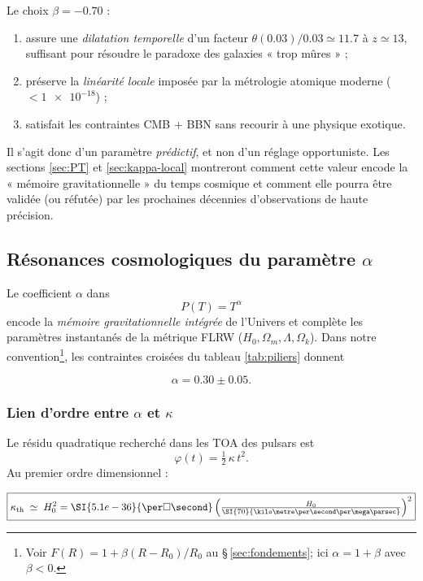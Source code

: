 \documentclass[11pt]{article}
\begin{document}
Le choix \(\beta=-0.70\) :

\begin{enumerate}[label=\arabic*.]
  \item assure une \emph{dilatation temporelle} d’un facteur
        \(\theta(0.03)/0.03\simeq11.7\) à \(z\simeq13\),
        suffisant pour résoudre le paradoxe des galaxies « trop mûres » ;
  \item préserve la \emph{linéarité locale} imposée par la métrologie
        atomique moderne (\(<\num{1e-18}\)) ;
  \item satisfait les contraintes CMB + BBN
        sans recourir à une physique exotique.
\end{enumerate}

Il s’agit donc d’un paramètre \emph{prédictif}, et non d’un réglage
opportuniste.  
Les sections \ref{sec:PT} et \ref{sec:kappa-local} montreront comment cette
valeur encode la « mémoire gravitationnelle » du temps cosmique et comment
elle pourra être validée (ou réfutée) par les prochaines décennies
d’observations de haute précision.

\subsection{Résonances cosmologiques du paramètre
            \texorpdfstring{\(\alpha\)}{alpha}}

Le coefficient \(\alpha\) dans  
\[
  P(T)=T^{\alpha}
\]
encode la \emph{mémoire gravitationnelle intégrée} de l’Univers et
complète les paramètres instantanés de la métrique FLRW
(\(H_{0},\Omega_{m},\Lambda,\Omega_{k}\)).
Dans notre convention\footnote{Voir
\(F(R)=1+\beta(R-R_{0})/R_{0}\) au
§\,\ref{sec:fondements}; ici \(\alpha=1+\beta\) avec \(\beta<0\).},
les contraintes croisées du tableau \ref{tab:piliers} donnent

\[
  \alpha = 0.30 \pm 0.05 .
\]

\subsubsection{Lien d’ordre entre
               \texorpdfstring{\(\alpha\)}{alpha} et
               \texorpdfstring{\(\kappa\)}{kappa}}
\label{sec:alpha-kappa}

Le résidu quadratique recherché dans les TOA des pulsars est
\[
  \varphi(t)=\tfrac12\,\kappa\,t^{2}.
\]
Au premier ordre dimensionnel :

\begin{equation}
  \boxed{ \kappa_{\mathrm{th}}\;\simeq\;H_{0}^{2} = \SI{5.1e-36}{\per\square\second}\, \Bigl(\tfrac{H_{0}}{\SI{70}{\kilo\metre\per\second\per\mega\parsec}}\Bigr)^{2}}
  \label{eq:kappa-H0}
\end{equation}
\end{document}
